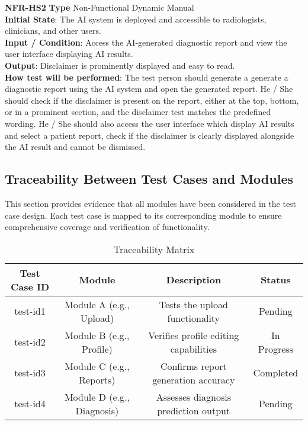 \documentclass[12pt, titlepage]{article}
\begin{document}
\noindent \textbf{NFR-HS2} \textbf{Type} Non-Functional Dynamic Manual\\
        \indent \textbf{Initial State}: The AI system is deployed and accessible to radiologists, clinicians, and other users.\\
        \indent \textbf{Input / Condition}: Access the AI-generated diagnostic report and view the user interface displaying AI results.\\
        \indent \textbf{Output}: Disclaimer is prominently displayed and easy to read. \\
        \indent \textbf{How test will be performed}: The test person should generate a generate a diagnostic report using the AI system and open the generated report. He / She should check if the disclaimer is present on the report, either at the top, bottom, or in a prominent section, and the disclaimer test matches the predefined wording. He / She should also access the user interface which display AI results and select a patient report, check if the disclaimer is clearly displayed alongside the AI result and cannot be dismissed. \\

\subsection{Traceability Between Test Cases and Modules}
This section provides evidence that all modules have been considered in the test case design. Each test case is mapped to its corresponding module to ensure comprehensive coverage and verification of functionality.

\begin{landscape}
\begin{table}[h]
    \centering
    \caption{Traceability Matrix}
    \begin{tabular}{|c|c|c|c|}
        \hline
        \textbf{Test Case ID} & \textbf{Module} & \textbf{Description} & \textbf{Status} \\
        \hline
        test-id1 & Module A (e.g., Upload) & Tests the upload functionality & Pending \\
        \hline
        test-id2 & Module B (e.g., Profile) & Verifies profile editing capabilities & In Progress \\
        \hline
        test-id3 & Module C (e.g., Reports) & Confirms report generation accuracy & Completed \\
        \hline
        test-id4 & Module D (e.g., Diagnosis) & Assesses diagnosis prediction output & Pending \\
        \hline
    \end{tabular}
\end{table}
\end{landscape}
\end{document}
